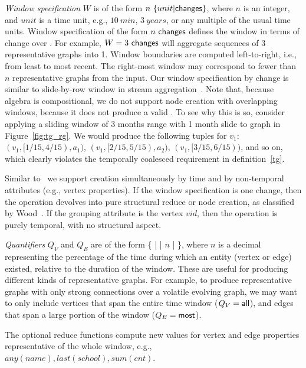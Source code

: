 {\em Window specification} $W$ is of the form
$n~\{unit|\textsf{changes}\}$, where $n$ is an integer, and $unit$ is a
time unit, e.g., $10~min$, $3~years$, or any multiple of the usual
time units.  Window specification of the form $n~\textsf{changes}$
defines the window in terms of change over \trg.  For example,
$W=3~\textsf{changes}$ will aggregate sequences of 3 representative
graphs into 1.  Window boundaries are computed left-to-right, i.e.,
from least to most recent.  The right-most window may correspond to
fewer than $n$ representative graphs from the input.
%
Our window specification by change is similar to slide-by-row window
in stream aggregation~\cite{Li2005}.  Note that, because \tg algebra
is compositional, we do not support node creation with overlapping
windows, because it does not produce a valid \tg.  To see why this is
so, consider applying a sliding window of 3 months range with 1 month
slide to graph  in Figure~\ref{fig:tg_rg}.  We would produce
the following tuples for $v_1$: $(v_1, [1/15, 4/15), a_1)$, $(v_1,
  [2/15, 5/15), a_2)$, $(v_1, [3/15, 6/15))$, and so on, which clearly
      violates the temporally coalesced requirement in
      definition~\ref{tg}.

Similar to~\cite{Li2005} we support creation simultaneously by time
and by non-temporal attributes (e.g., vertex properties).  If the
window specification is one change, then the operation devolves into
pure structural reduce or node creation, as classified by
Wood~\cite{Wood2012}.  If the grouping attribute is the vertex $vid$,
then the operation is purely temporal, with no structural aspect.

{\em Quantifiers} $Q_V$ and $Q_E$ are of the form \{  |
 |  $n$ |  \}, where $n$ is
a decimal representing the percentage of the time during which an
entity (vertex or edge) existed, relative to the duration of the
window. These are useful for producing different kinds of
representative graphs.  For example, to produce representative graphs
with only strong connections over a volatile evolving graph, we may
want to only include vertices that span the entire time window
($Q_V=\textsf{all}$), and edges that span a large portion of the window
($Q_E=\textsf{most}$).
 
The optional reduce functions compute new
values for vertex and edge properties representative of
the whole window, e.g., $any(name), last(school), sum(cnt)$.
%
 
